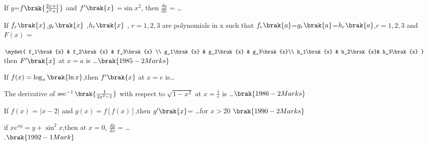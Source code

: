 
\iffalse
  \title{Assignment}
  \author{Kotha Pratheek Reddy}
  \section{fitb}
\fi
    \item If $y$=$f{\brak{\frac{2x+1}{x^2+1}}}$ and $f^{\prime}\brak{x}$ =$\sin{x}^2$, then $\frac{dy}{dx}$ = \dots\hfill {} 
    \item If $f_r\brak{x}$,$g_r\brak{x}$ ,$h_r\brak{x}$ , $r=1,2,3$ are polynomials in x such that  $f_r\brak{a}$=$g_r\brak{a}$=$h_r\brak{a}$,$r=1,2,3$ and \\$F(x)$ = 


    $\mydet{
			f_1\brak{x} & f_2\brak{x} & f_3\brak{x} \\
			g_1\brak{x} & g_2\brak{x} & g_3\brak{x}\\
			h_1\brak{x} & h_2\brak{x}& h_3\brak{x}
		}  $
    then $F^{\prime}\brak{x}$ at $x=a$ is \dots $\hfill\brak{1985 -2Marks}$
\item If $f(x)=\log_{x}\brak{\ln{x}}$,then $f^{\prime}\brak{x}$ at $x=e$ is\dots \hfill {} 
\item The derivative of $\sec^{-1}{\brak{\frac{1}{2x^2-1}}}$ with respect to $\sqrt{1-x^2}$
at $x=\frac{1}{e}$ is \dots $\hfill\brak{1986 -2Marks}$
\item If $f(x)$ = $|x-2|$ and $g(x)=f[f(x)]$,then $g^{\prime}\brak{x}$= \dots for $x>20$ $\hfill\brak{1990-2 Marks}$  
\item if $xe^{xy}=y+\sin^2{x}$,then at $x=0$, $\frac{dy}{dx}$ = \dots\\.$\hfill \brak{1992-1Mark}$
